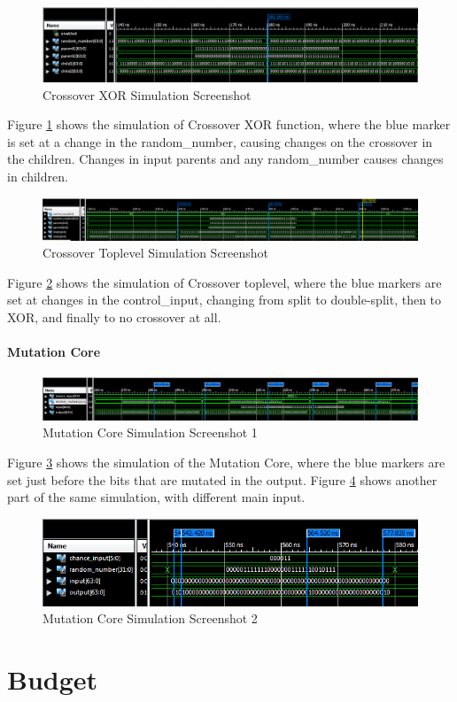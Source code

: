 \begin{figure}[H]
\includegraphics[width=\textwidth]{fpga/fig/testbenches/crossover_xor_simulation1.png}
\caption{Crossover XOR Simulation Screenshot}
\label{fig_crossover_xor_testbench}
\end{figure}

Figure \ref{fig_crossover_xor_testbench} shows the simulation of Crossover XOR function, where the blue marker is set at a change in the random\_number, causing changes on the crossover in the children.
Changes in input parents and any random\_number causes changes in children. 

\begin{figure}[H]
\includegraphics[width=\textwidth]{fpga/fig/testbenches/crossover_toplevel_testbench.png}
\caption{Crossover Toplevel Simulation Screenshot}
\label{fig_crossover_toplevel_testbench}
\end{figure}

Figure \ref{fig_crossover_toplevel_testbench} shows the simulation of Crossover toplevel, where the blue markers are set at changes in the control\_input, changing from split to double-split, then to XOR, and finally to no crossover at all.

\subsubsection{Mutation Core}
\begin{figure}[H]
\includegraphics[width=\textwidth]{fpga/fig/testbenches/mutation_simulation1.png}
\caption{Mutation Core Simulation Screenshot 1}
\label{fig_mutation_testbench1}
\end{figure}

Figure \ref{fig_mutation_testbench1} shows the simulation of the Mutation Core, where the blue markers are set just before the bits that are mutated in the output.
Figure \ref{fig_mutation_testbench2} shows another part of the same simulation, with different main input.

\begin{figure}[H]
\includegraphics[width=\textwidth]{fpga/fig/testbenches/mutation_simulation2.png}
\caption{Mutation Core Simulation Screenshot 2}
\label{fig_mutation_testbench2}
\end{figure}


\chapter{Budget} \label{appendix:budget}
\newpage
